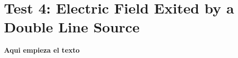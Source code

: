 \documentclass[../Dissertation]{subfiles}
\begin{document}
\section{Test 4: Electric Field Exited by a Double Line Source}\label{sec5:doubleLine}
  \textbf{Aqui empieza el texto} 
  \lipsum[1]

\end{document}
